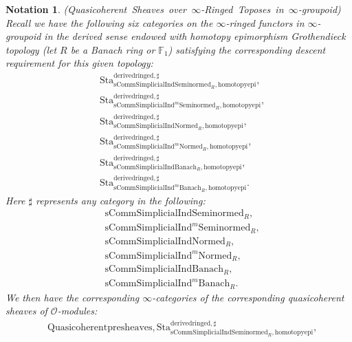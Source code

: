 \documentclass[12pt]{book}
\newtheorem{notation}{Notation}
\begin{document}
\begin{notation}\mbox{\rm{(Quasicoherent Sheaves over $\infty$-Ringed Toposes in $\infty$-groupoid)}}
Recall we have the following six categories on the $\infty$-ringed functors in $\infty$-groupoid in the derived sense endowed with homotopy epimorphism Grothendieck topology (let $R$ be a Banach ring or $\mathbb{F}_1$) satisfying the corresponding descent requirement for this given topology:
\begin{align}
&\mathrm{Sta}^\mathrm{derivedringed,\sharp}_{\mathrm{sComm}\mathrm{Simplicial}\mathrm{Ind}\mathrm{Seminormed}_R,\mathrm{homotopyepi}},\\
&\mathrm{Sta}^\mathrm{derivedringed,\sharp}_{\mathrm{sComm}\mathrm{Simplicial}\mathrm{Ind}^m\mathrm{Seminormed}_R,\mathrm{homotopyepi}},\\
&\mathrm{Sta}^\mathrm{derivedringed,\sharp}_{\mathrm{sComm}\mathrm{Simplicial}\mathrm{Ind}\mathrm{Normed}_R,\mathrm{homotopyepi}},\\
&\mathrm{Sta}^\mathrm{derivedringed,\sharp}_{\mathrm{sComm}\mathrm{Simplicial}\mathrm{Ind}^m\mathrm{Normed}_R,\mathrm{homotopyepi}},\\
&\mathrm{Sta}^\mathrm{derivedringed,\sharp}_{\mathrm{sComm}\mathrm{Simplicial}\mathrm{Ind}\mathrm{Banach}_R,\mathrm{homotopyepi}},\\
&\mathrm{Sta}^\mathrm{derivedringed,\sharp}_{\mathrm{sComm}\mathrm{Simplicial}\mathrm{Ind}^m\mathrm{Banach}_R,\mathrm{homotopyepi}}.	
\end{align}
Here $\sharp$ represents any category in the following:
\begin{align}
&\mathrm{sComm}\mathrm{Simplicial}\mathrm{Ind}\mathrm{Seminormed}_R,\\
&\mathrm{sComm}\mathrm{Simplicial}\mathrm{Ind}^m\mathrm{Seminormed}_R,\\
&\mathrm{sComm}\mathrm{Simplicial}\mathrm{Ind}\mathrm{Normed}_R,\\
&\mathrm{sComm}\mathrm{Simplicial}\mathrm{Ind}^m\mathrm{Normed}_R,\\
&\mathrm{sComm}\mathrm{Simplicial}\mathrm{Ind}\mathrm{Banach}_R,\\
&\mathrm{sComm}\mathrm{Simplicial}\mathrm{Ind}^m\mathrm{Banach}_R.	
\end{align}	
We then have the corresponding $\infty$-categories of the corresponding quasicoherent sheaves of $\mathcal{O}$-modules:
\begin{align}
&\mathrm{Quasicoherentpresheaves,Sta}^\mathrm{derivedringed,\sharp}_{\mathrm{sComm}\mathrm{Simplicial}\mathrm{Ind}\mathrm{Seminormed}_R,\mathrm{homotopyepi}},\\

\end{align}
\end{notation}
\end{document}
